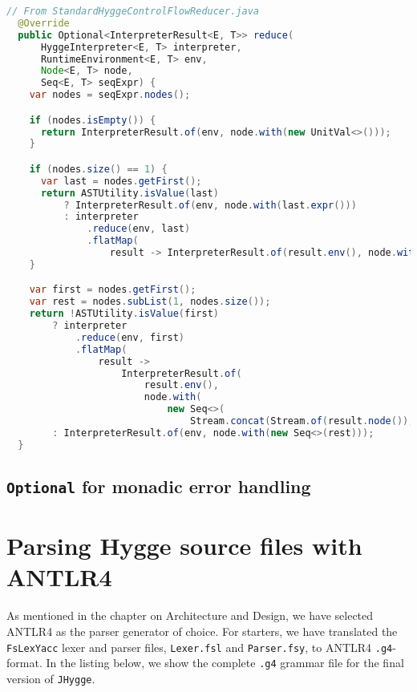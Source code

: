 \begin{lstlisting}[language=Java]
  // From StandardHyggeControlFlowReducer.java
  @Override
  public Optional<InterpreterResult<E, T>> reduce(
      HyggeInterpreter<E, T> interpreter,
      RuntimeEnvironment<E, T> env,
      Node<E, T> node,
      Seq<E, T> seqExpr) {
    var nodes = seqExpr.nodes();

    if (nodes.isEmpty()) {
      return InterpreterResult.of(env, node.with(new UnitVal<>()));
    }

    if (nodes.size() == 1) {
      var last = nodes.getFirst();
      return ASTUtility.isValue(last)
          ? InterpreterResult.of(env, node.with(last.expr()))
          : interpreter
              .reduce(env, last)
              .flatMap(
                  result -> InterpreterResult.of(result.env(), node.with(result.node().expr())));
    }

    var first = nodes.getFirst();
    var rest = nodes.subList(1, nodes.size());
    return !ASTUtility.isValue(first)
        ? interpreter
            .reduce(env, first)
            .flatMap(
                result ->
                    InterpreterResult.of(
                        result.env(),
                        node.with(
                            new Seq<>(
                                Stream.concat(Stream.of(result.node()), rest.stream()).toList()))))
        : InterpreterResult.of(env, node.with(new Seq<>(rest)));
  }
\end{lstlisting}

\subsection{\texttt{Optional} for monadic error handling}

\section{Parsing Hygge source files with ANTLR4}

As mentioned in the chapter on Architecture and Design, we have selected ANTLR4 as the parser generator of choice. For starters,
we have translated the \texttt{FsLexYacc} lexer and parser files, \texttt{Lexer.fsl} and \texttt{Parser.fsy}, to ANTLR4
\texttt{.g4}-format. In the listing below, we show the complete \texttt{.g4} grammar file for the final version of \texttt{JHygge}.

